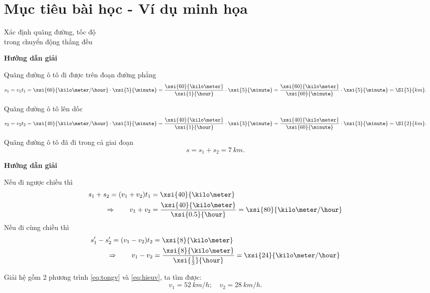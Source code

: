 \section{Mục tiêu bài học - Ví dụ minh họa}
\begin{dang}{Xác định quãng đường, tốc độ \\trong chuyển động thẳng đều}
	{	\begin{center}
			\textbf{Hướng dẫn giải}
		\end{center}
		
		Quãng đường ô tô đi được trên đoạn đường phẳng
		$$s_1 =v_1t_1 =\xsi{60}{\kilo\meter/\hour}\cdot\xsi{5}{\minute}=\dfrac{\xsi{60}{\kilo\meter}}{\xsi{1}{\hour}}\cdot\xsi{5}{\minute}=\dfrac{\xsi{60}{\kilo\meter}}{\xsi{60}{\minute}}\cdot\xsi{5}{\minute}=\SI{5}{km}.$$
		
		Quãng đường ô tô lên dốc
		$$s_2 = v_2t_2=\xsi{40}{\kilo\meter/\hour}\cdot\xsi{3}{\minute}=\dfrac{\xsi{40}{\kilo\meter}}{\xsi{1}{\hour}}\cdot\xsi{3}{\minute}=\dfrac{\xsi{40}{\kilo\meter}}{\xsi{60}{\minute}}\cdot\xsi{3}{\minute} = \SI{2}{km}.$$
		
		Quãng đường ô tô đã đi trong cả giai đoạn
		$$s = s_1+s_2 = \SI{7}{km}.$$
		
	}
	{	\begin{center}
			\textbf{Hướng dẫn giải}
		\end{center}
		
		Nếu đi ngược chiều thì 
		\begin{align}
			s_1+s_2 =(v_1+v_2)t_1 &=\xsi{40}{\kilo\meter}\nonumber\\
			\Rightarrow\qquad v_1+v_2&=\dfrac{\xsi{40}{\kilo\meter}}{\xsi{0.5}{\hour}}=\xsi{80}{\kilo\meter/\hour}\label{eq:tongv}
		\end{align}
		Nếu đi cùng chiều thì	
		\begin{align}
			s'_1-s'_2 =(v_1-v_2)t_2 &=\xsi{8}{\kilo\meter}\nonumber\\
			\Rightarrow\qquad v_1-v_2&=\dfrac{\xsi{8}{\kilo\meter}}{\xsi{\frac{1}{3}}{\hour}}=\xsi{24}{\kilo\meter/\hour}\label{eq:hieuv}
		\end{align}
		
		Giải hệ gồm 2 phương trình \eqref{eq:tongv} và \eqref{eq:hieuv}, ta tìm được:
		$$v_1 = \SI{52}{km/h};\quad v_2 =\SI{28}{km/h}.$$
		
		
		
	}
\end{dang}
